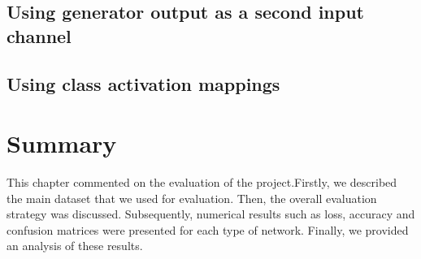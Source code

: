 \documentclass{l4proj}
\begin{document}
\subsection{Using generator output as a second input channel}
\subsection{Using class activation mappings}
\section{Summary}
This chapter commented on the evaluation of the project.Firstly, we described the main dataset that we used for evaluation. Then, the overall evaluation strategy was discussed. Subsequently, numerical results such as loss, accuracy and confusion matrices were presented for each type of network. Finally, we provided an analysis of these results.





\end{document}
